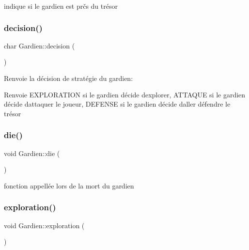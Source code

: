 indique si le gardien est prčs du trésor 

\mbox{\label{classGardien_ab840e41dd18ea6bd8306fa15bb611372}} 
\subsubsection{\texorpdfstring{decision()}{decision()}}
{\footnotesize\ttfamily char Gardien\+::decision (\begin{DoxyParamCaption}{ }\end{DoxyParamCaption})}



Renvoie la décision de stratégie du gardien\+: 

\begin{DoxyReturn}{Renvoie}
E\+X\+P\+L\+O\+R\+A\+T\+I\+ON si le gardien décide d\textquotesingle{}explorer, A\+T\+T\+A\+Q\+UE si le gardien décide d\textquotesingle{}attaquer le joueur, D\+E\+F\+E\+N\+SE si le gardien décide d\textquotesingle{}aller défendre le trésor 
\end{DoxyReturn}
\mbox{\label{classGardien_a17d57e80bce205161c98c557bb6e7a9c}} 
\subsubsection{\texorpdfstring{die()}{die()}}
{\footnotesize\ttfamily void Gardien\+::die (\begin{DoxyParamCaption}{ }\end{DoxyParamCaption})\hspace{0.3cm}{\ttfamily [private]}}



fonction appellée lors de la mort du gardien 

\mbox{\label{classGardien_a8b3b6c0120adeaf40365c1b5f95b1a18}} 
\subsubsection{\texorpdfstring{exploration()}{exploration()}}
{\footnotesize\ttfamily void Gardien\+::exploration (\begin{DoxyParamCaption}{ }\end{DoxyParamCaption})\hspace{0.3cm}{\ttfamily [private]}}



